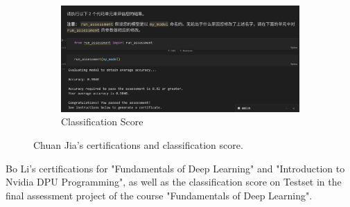 \documentclass[12pt]{article}
\begin{document}
\begin{figure}[H]
	\vspace{1em}
	
	\begin{subfigure}[b]{0.8\textwidth}
		\includegraphics[width=\linewidth]{Chuan_Jia_Classification_Score.png}
		\caption{Classification Score}
	\end{subfigure}
	\caption{Chuan Jia's certifications and classification score.}
	\label{fig:CJ_certification}
\end{figure}

Bo Li's certifications for "Fundamentals of Deep Learning" and "Introduction to Nvidia DPU Programming", as well as the classification score on Testset in the final assessment project of the course "Fundamentals of Deep Learning".
\end{document}
